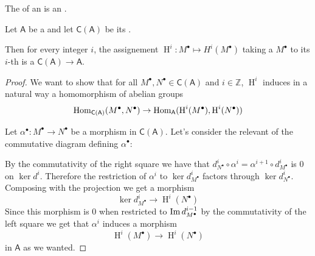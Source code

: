\documentclass[../../main]{subfiles}
\begin{document}
\begin{lemma}
  The  of an  is an .
\end{lemma}

\begin{lemma}
  Let \(\mathsf{A}\) be a  and let \(\mathsf{C}(\mathsf{A})\) be its .

  Then for every integer \(i\), the assignement \(\operatorname{H}^{i}: M^{\bullet} \mapsto H^{i}(M^{\bullet})\) taking a  \(M^{\bullet}\) to its \(i\)-th  is a  \(\mathsf{C}(\mathsf{A}) \to \mathsf{A}\).
\end{lemma}
\begin{proof}
  We want to show that for all  \(M^{\bullet}, N^{\bullet} \in \mathsf{C}(\mathsf{A})\) and \(i \in \mathbb{Z}\), \(\operatorname{H}^{i}\) induces in a natural way a homomorphism of abelian groups
  \begin{equation*}
    \operatorname{Hom}_{\mathsf{C}(\mathsf{A})}(M^{\bullet}, N^{\bullet}) \to \operatorname{Hom}_{\mathsf{A}}(\operatorname{H}^{i}(M^{\bullet}), \operatorname{H}^{i}(N^{\bullet}))
  \end{equation*}

  Let \(\alpha^{\bullet}: M^{\bullet} \to N^{\bullet}\) be a morphism in \(\mathsf{C}(\mathsf{A})\). Let's consider the relevant of the commutative diagram defining \(\alpha^{\bullet}\):
  \begin{center}
  \end{center}
  By the commutativity of the right square we have that \(d_{N^{\bullet}}^{i} \circ \alpha^{i} = \alpha^{i+1} \circ d_{M^{\bullet}}^{i}\) is 0 on \(\ker d^{i}\).
  Therefore the restriction of \(\alpha^{i}\) to \(\ker d_{M^{\bullet}}^{i}\) factors through \(\ker d_{N^{\bullet}}^{i}\).
  Composing with the projection we get a morphism
  \begin{equation*}
    \ker d_{M^{\bullet}}^{i} \to \operatorname{H}^{i}(N^{\bullet})
  \end{equation*}
  Since this morphism is 0 when restricted to \(\operatorname*{Im} d_{M^{\bullet}}^{i-1}\) by the commutativity of the left square we get that \(\alpha^{i}\) induces a morphism
  \begin{equation*}
    \operatorname{H}^{i}(M^{\bullet}) \to \operatorname{H}^{i}(N^{\bullet})
  \end{equation*}
  in \(\mathsf{A}\) as we wanted.
\end{proof}
\end{document}
